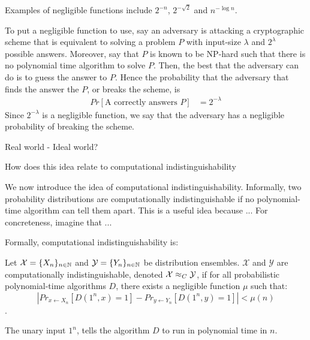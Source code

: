 Examples of negligible functions include $2^{-n}$, $2^{- \sqrt{2}}$ and $n^{- \log n}$. 

To put a negligible function to use, say an adversary is attacking a cryptographic scheme that is equivalent to solving a problem $P$ with input-size $\lambda$ and $2^{\lambda}$ possible answers. 
Moreover, say that $P$ is known to be NP-hard such that there is no polynomial time algorithm to solve $P$. 
Then, the best that the adversary can do is to guess the answer to $P$.
Hence the probability that the adversary that finds the answer the $P$, or breaks the scheme, is 
\begin{align*}
Pr[\text{A correctly answers $P$}] & = {2^{- \lambda}}
\end{align*}
Since $2^{- \lambda}$ is a negligible function, we say that the adversary has a negligible probability of breaking the scheme. 

Real world - Ideal world?

How does this idea relate to computational indistinguishability

We now introduce the idea of computational indistinguishability. 
Informally, two probability distributions are computationally indistinguishable if no polynomial-time algorithm can tell them apart. 
This is a useful idea because ...
For concreteness, imagine that ...

Formally, computational indistinguishability is:

\begin{definition}
\label{defn:computational-indistinguishability}
Let $\mathcal{X} = \{X_n\}_{n \in \mathbb{N}}$ and $\mathcal{Y} = \{Y_n\}_{n \in \mathbb{N}}$ be distribution ensembles.
$\mathcal{X}$ and $\mathcal{Y}$ are computationally indistinguishable, denoted $\mathcal{X} \approx_C \mathcal{Y}$, if for all probabilistic polynomial-time algorithms $D$, there exists a negligible function $\mu$ such that:
\begin{equation}
    |Pr_{x \gets X_n} [D(1^n, x) = 1] - Pr_{y \gets Y_n} [D(1^n, y) = 1]| < \mu(n)
\end{equation}
\cite{katzlindelltextbook}.
\end{definition}

The unary input $1^n$, tells the algorithm $D$ to run in polynomial time in $n$.

